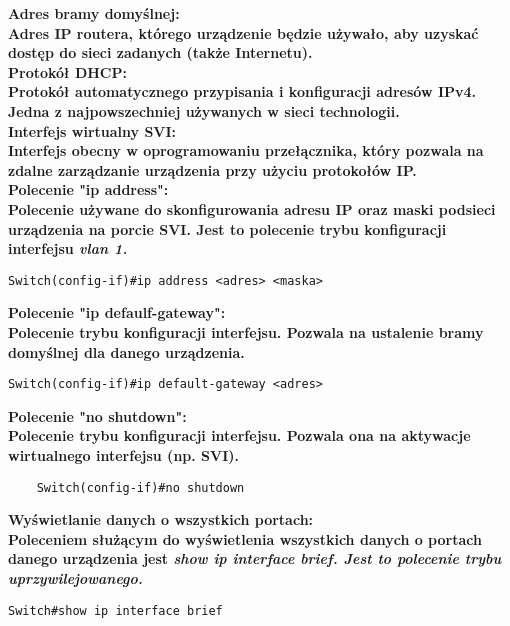 \documentclass[a4paper,12pt]{article}
\newcommand{\h}[1]{\noindent \bf #1 \rm \\ \noindent}
\begin{document}
\h{Adres bramy domyślnej:}
Adres IP routera, którego urządzenie będzie używało, aby uzyskać dostęp do sieci zadanych (także Internetu).\\

\h{Protokół DHCP:}
Protokół automatycznego przypisania i konfiguracji adresów IPv4. Jedna z najpowszechniej używanych w sieci technologii.\\

\h{Interfejs wirtualny SVI:}
Interfejs obecny w oprogramowaniu przełącznika, który pozwala na zdalne zarządzanie urządzenia przy użyciu protokołów IP.\\

\newpage
\h{Polecenie "ip address":}
Polecenie używane do skonfigurowania adresu IP oraz maski podsieci urządzenia na porcie SVI. Jest to polecenie trybu konfiguracji interfejsu \it vlan 1\rm.
\begin{lstlisting}
Switch(config-if)#ip address <adres> <maska>
\end{lstlisting}
\vspace{5mm}

\h{Polecenie "ip defaulf-gateway":}
Polecenie trybu konfiguracji interfejsu. Pozwala na ustalenie bramy domyślnej dla danego urządzenia.
\begin{lstlisting}
Switch(config-if)#ip default-gateway <adres>
\end{lstlisting}
\vspace{5mm}

\h{Polecenie "no shutdown":}
Polecenie trybu konfiguracji interfejsu. Pozwala ona na aktywacje wirtualnego interfejsu (np. SVI).
\begin{lstlisting}
	Switch(config-if)#no shutdown
\end{lstlisting}
\vspace{5mm}

\h{Wyświetlanie danych o wszystkich portach:}
Poleceniem służącym do wyświetlenia wszystkich danych o portach danego urządzenia jest \it show ip interface brief\rm. Jest to polecenie trybu uprzywilejowanego.
\begin{lstlisting}
Switch#show ip interface brief
\end{lstlisting}
\vspace{5mm}
\end{document}
